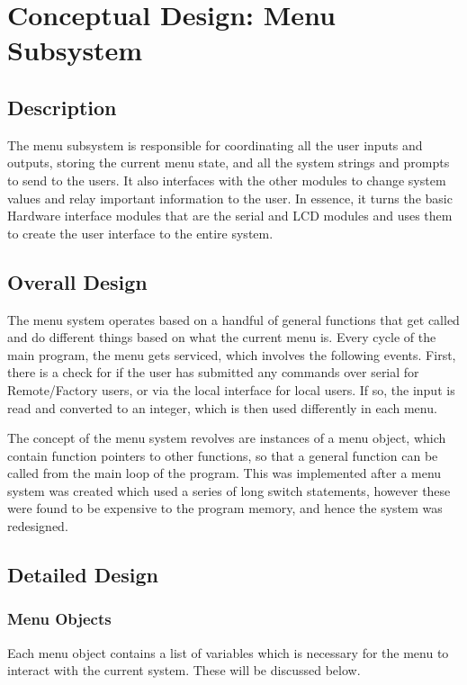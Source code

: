\documentclass[]{report}
\begin{document}
\section{Conceptual Design: Menu Subsystem}
\subsection{Description}
The menu subsystem is responsible for coordinating all the user inputs and outputs, storing the current menu state, and all the system strings and prompts to send to the users. It also interfaces with the other modules to change system values and relay important information to the user. In essence, it turns the basic Hardware interface modules that are the serial and LCD modules and uses them to create the user interface to the entire system.

\subsection{Overall Design}
The menu system operates based on a handful of general functions that get called and do different things based on what the current menu is. Every cycle of the main program, the menu gets serviced, which involves the following events. First, there is a check for if the user has submitted any commands over serial for Remote/Factory users, or via the local interface for local users. If so, the input is read and converted to an integer, which is then used differently in each menu.

The concept of the menu system revolves are instances of a menu object, which contain function pointers to other functions, so that a general function can be called from the main loop of the program. This was implemented after a menu system was created which used a series of long switch statements, however these were found to be expensive to the program memory, and hence the system was redesigned. 

\subsection{Detailed Design}

\subsubsection{Menu Objects}
Each menu object contains a list of variables which is necessary for the menu to interact with the current system. These will be discussed below. 
\end{document}
